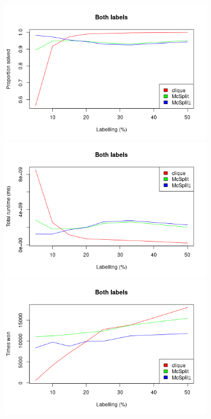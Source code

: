 \documentclass{l4proj}
\theoremstyle{definition}
\theoremstyle{remark}
\begin{document}
\begin{figure}
\begin{subfigure}[t]{0.49\textwidth}
  \end{subfigure}
  \begin{subfigure}[t]{0.49\textwidth}
    \centering
    \includegraphics[width=\textwidth]{images/both_labels_linechart.png}
    \includegraphics[width=\textwidth]{images/both_labels_linechart2.png}
    \includegraphics[width=\textwidth]{images/both_labels_linechart3.png}

\end{subfigure}
\end{figure}
\end{document}
